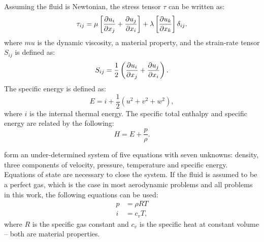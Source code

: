 Assuming the fluid is Newtonian, the stress tensor $\tau$ can be written as:
\begin{equation*}
    \tau_{ij} = \mu \left [
         \frac{\partial u_i}{\partial x_j}  +  \frac{\partial u_j}{\partial x_i} 
    \right ]
    + \lambda \left [
         \frac{\partial u_k}{\partial x_k} 
    \right ] \delta_{ij}.
\end{equation*}
where $mu$ is the dynamic viscosity, a material property, and the strain-rate tensor $S_{ij}$ is defined as:
\begin{equation*}
    S_{ij} = \frac{1}{2}\left(
         \frac{\partial u_i}{\partial x_j}  +  \frac{\partial u_j}{\partial x_i} 
    \right).
\end{equation*}
The specific energy is defined as:
\begin{equation*}
    E = i + \frac{1}{2}(u^2 + v^2 + w^2),
\end{equation*}
where $i$ is the internal thermal energy.
The specific total enthalpy and specific energy are related by the following:
\begin{equation*}
    H = E + \frac{p}{\rho}.
\end{equation*}

 form an under-determined system of five equations with seven unknowns: density, three components of velocity, pressure, temperature and specific energy. Equations of state are necessary to close the system. If the fluid is assumed to be a perfect gas, which is the case in most aerodynamic problems and all problems in this work, the following equations can be used:
\begin{align}
    p &= \rho R T \label{eq:state1}\\
    i &= c_v T \label{eq:state2},
\end{align}
where $R$ is the specific gas constant and $c_v$ is the specific heat at constant volume -- both are material properties.

